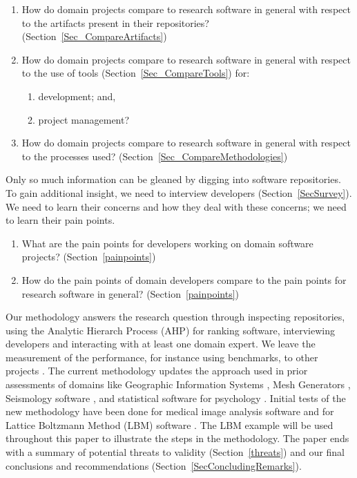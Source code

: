 \documentclass[runningheads]{llncs}
\newcounter{rqnum} %
\newcommand{\rqref}[1]{RQ\ref{#1}}
\begin{document}
\begin{enumerate}
  \item [RQ\refstepcounter{rqnum}\therqnum \label{RQ_CompareArtifacts}:] How
	do domain projects compare to research software in general with respect to the
	artifacts present in their repositories? (Section~\ref{Sec_CompareArtifacts})
	\item [RQ\refstepcounter{rqnum}\therqnum \label{RQ_CompareToolsProjMngmnt}:]
	How do domain projects compare to research software in general with respect to
	the use of tools (Section~\ref{Sec_CompareTools}) for:
	\begin{enumerate} 
		\item [\rqref{RQ_CompareToolsProjMngmnt}.a] development; and,
		\item [\rqref{RQ_CompareToolsProjMngmnt}.b] project management?
	\end{enumerate}
	\item [RQ\refstepcounter{rqnum}\therqnum \label{RQ_CompareMethodologies}:]
	How do domain projects compare to research software in general with respect to
	the processes used? (Section~\ref{Sec_CompareMethodologies})
\end{enumerate}	

Only so much information can be gleaned by digging into software repositories.
To gain additional insight, we need to interview developers
(Section~\ref{SecSurvey}).  We need to learn their concerns and how they deal
with these concerns; we need to learn their pain points.

\begin{enumerate}
	\item [RQ\refstepcounter{rqnum}\therqnum \label{RQ_PainPoints}:] What are
	the pain points for developers working on domain software projects?
	(Section~\ref{painpoints})
	\item [RQ\refstepcounter{rqnum}\therqnum \label{RQ_ComparePainPoints}:] How
	do the pain points of domain developers compare to the pain points
	for research software in general? (Section~\ref{painpoints})
\end{enumerate}

Our methodology answers the research question through inspecting repositories,
using the Analytic Hierarch Process (AHP) for ranking software, interviewing
developers and interacting with at least one domain expert.  We leave the
measurement of the performance, for instance using benchmarks, to other projects
\cite{KaagstromEtAl1998}. The current methodology updates the approach used in
prior assessments of domains like Geographic Information Systems
\cite{SmithEtAl2018_arXivGIS}, Mesh Generators \cite{SmithEtAl2016}, Seismology
software \cite{SmithEtAl2018}, and statistical software for psychology
\cite{SmithEtAl2018_StatSoft}.  Initial tests of the new methodology have been
done for medical image analysis software \cite{Dong2021} and for Lattice
Boltzmann Method (LBM) software \cite{Michalski2021}.  The LBM example will be
used throughout this paper to illustrate the steps in the methodology.  The
paper ends with a summary of potential threats to validity
(Section~\ref{threats}) and our final conclusions and recommendations
(Section~\ref{SecConcludingRemarks}).
\end{document}
